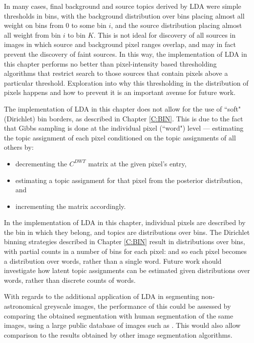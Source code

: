 In many cases, final background and source topics derived by LDA were simple thresholds in bins, with the background distribution over bins placing almost all weight on bins from $0$ to some bin $i$, and the source distribution placing almost all weight from bin $i$ to bin $K$. This is not ideal for discovery of all sources in images in which source and background pixel ranges overlap, and may in fact prevent the discovery of faint sources. In this way, the implementation of LDA in this chapter performs no better than pixel-intensity based thresholding algorithms that restrict search to those sources that contain pixels above a particular threshold. Exploration into why this thresholding in the distribution of pixels happens and how to prevent it is an important avenue for future work.

The implementation of LDA in this chapter does not allow for the use of ``soft" (Dirichlet) bin borders, as described in Chapter \ref{C:BIN}. This is due to the fact that Gibbs sampling is done at the individual pixel (``word") level --- estimating the topic assignment of each pixel conditioned on the topic assignments of all others by:
\begin{itemize}
\item decrementing the $C^{DWT}$ matrix at the given pixel's entry, 
\item estimating a topic assignment for that pixel from the posterior distribution, and 
\item incrementing the matrix accordingly. 
\end{itemize}
In the implementation of LDA in this chapter, individual pixels are described by the bin in which they belong, and topics are distributions over bins. The Dirichlet binning strategies described in Chapter \ref{C:BIN} result in distributions over bins, with partial counts in a number of bins for each pixel: and so each pixel becomes a distribution over words, rather than a single word. Future work should investigate how latent topic assignments can be estimated given distributions over words, rather than discrete counts of words. 

With regards to the additional application of LDA in segmenting non-astronomical greyscale images, the performance of this could be assessed by comparing the obtained segmentation with human segmentation of the same images, using a large public database of images such as \cite{martin2001database}. This would also allow comparison to the results obtained by other image segmentation algorithms. 

